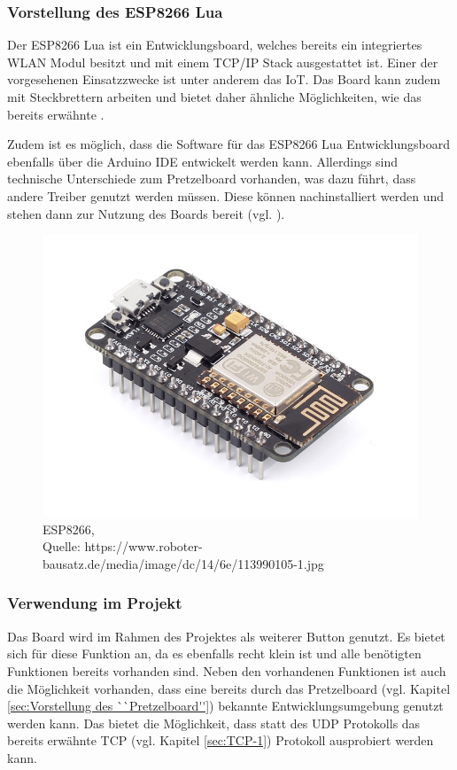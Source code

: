 \subsubsection{Vorstellung des ESP8266 Lua}        
\label{sec:Vorstellung des ESP8266} 

Der ESP8266 Lua ist ein Entwicklungsboard, welches bereits ein integriertes \ac{WLAN} Modul besitzt und mit einem \ac{TCP}/\ac{IP} Stack ausgestattet ist. Einer der vorgesehenen Einsatzzwecke ist unter anderem das \ac{IoT}. Das Board kann zudem mit Steckbrettern arbeiten und bietet daher ähnliche Möglichkeiten, wie das bereits erwähnte . 

Zudem ist es möglich, dass die Software für das ESP8266 Lua Entwicklungsboard ebenfalls über die Arduino \ac{IDE} entwickelt werden kann. Allerdings sind technische Unterschiede zum Pretzelboard vorhanden, was dazu führt, dass andere Treiber genutzt werden müssen. 
Diese können nachinstalliert werden und stehen dann zur Nutzung des Boards bereit (vgl. \cite{Carius.15.01.2017}\cite{.d}).

\begin{figure}[!htb]
	\centering
	\includegraphics[scale=0.4]{ESP.jpg}
	\caption[ESP8266]{ESP8266,\\ Quelle: https://www.roboter-bausatz.de/media/image/dc/14/6e/113990105-1.jpg}
\end{figure}

\subsubsection{Verwendung im Projekt}        
\label{sec:Verwendung des ESP8266} 
Das Board wird im Rahmen des Projektes als weiterer Button genutzt. Es bietet sich für diese Funktion an, da es ebenfalls recht klein ist und alle benötigten Funktionen bereits vorhanden sind. Neben den vorhandenen Funktionen ist auch die Möglichkeit vorhanden, dass eine bereits durch das Pretzelboard (vgl. Kapitel \ref{sec:Vorstellung des ``Pretzelboard''}) bekannte Entwicklungsumgebung genutzt werden kann. Das bietet die Möglichkeit, dass statt des \ac{UDP} Protokolls das bereits erwähnte \ac{TCP} (vgl. Kapitel \ref{sec:TCP-1}) Protokoll ausprobiert werden kann. 

